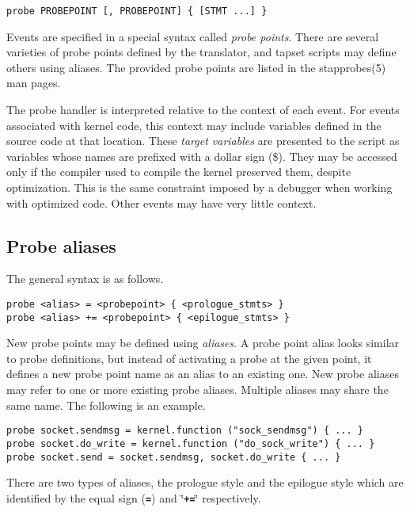 \documentclass[twoside,english]{article}
\newenvironment{vindent}
{\begin{list}{}{\setlength{\listparindent}{6pt}}
\item[]}
{\end{list}}
\begin{document}
\begin{vindent}
\begin{verbatim}
probe PROBEPOINT [, PROBEPOINT] { [STMT ...] }
\end{verbatim}
\end{vindent}
Events are specified in a special syntax called \emph{probe points}. There
are several varieties of probe points defined by the translator, and tapset
scripts may define others using aliases. The provided probe points are listed
in the stapprobes(5) man pages.

The probe handler is interpreted relative to the context of each event. For
events associated with kernel code, this context may include variables defined
in the source code at that location. These \emph{target variables}
are presented to the script as variables whose names are prefixed with a
dollar sign (\$). They may be accessed only if the compiler used to compile
the kernel preserved them, despite optimization. This is the same constraint
imposed by a debugger when working with optimized code. Other events may
have very little context.


\subsection{Probe aliases\label{sub:Probe-aliases}}
The general syntax is as follows.

\begin{vindent}
\begin{verbatim}
probe <alias> = <probepoint> { <prologue_stmts> }
probe <alias> += <probepoint> { <epilogue_stmts> }
\end{verbatim}
\end{vindent}
New probe points may be defined using \emph{aliases}. A probe point alias
looks similar to probe definitions, but instead of activating a probe at
the given point, it defines a new probe point name as an alias to an existing
one. New probe aliases may refer to one or more existing probe aliases.
Multiple aliases may share the same name. The following is an example.

\begin{vindent}
\begin{verbatim}
probe socket.sendmsg = kernel.function ("sock_sendmsg") { ... }
probe socket.do_write = kernel.function ("do_sock_write") { ... }
probe socket.send = socket.sendmsg, socket.do_write { ... }
\end{verbatim}
\end{vindent}
There are two types of aliases, the prologue style and the epilogue style
which are identified by the equal sign (\texttt{\textbf{=}}) and \char`\"{}\texttt{\textbf{+=}}\char`\"{}
respectively.
\end{document}
